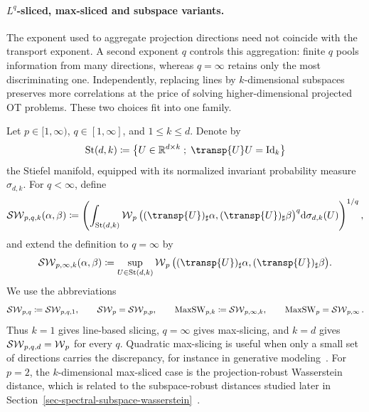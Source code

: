 \paragraph{$L^q$-sliced, max-sliced and subspace variants.}

The exponent used to aggregate projection directions need not coincide with the
transport exponent. A second exponent $q$ controls this aggregation: finite
$q$ pools information from many directions, whereas $q=\infty$ retains only
the most discriminating one. Independently, replacing lines by
$k$-dimensional subspaces preserves more correlations at the price of solving
higher-dimensional projected OT problems. These two choices fit into one
family.

\begin{defn}\label{def-sliced-variants}
	Let $p\in[1,\infty)$, $q\in[1,\infty]$, and $1\leq k\leq d$. Denote by
	\[
		\mathrm{St}(d,k)
		\eqdef
		\enscond{U\in\RR^{d\times k}}{\transp{U}U=\Id_k}
	\]
	the Stiefel manifold, equipped with its normalized invariant probability
	measure $\sigma_{d,k}$. For $q<\infty$, define
	\begin{equation}\label{eq-lq-subspace-sliced}
		\SW_{p,q,k}(\alpha,\beta)
		\eqdef
		\left(
			\int_{\mathrm{St}(d,k)}
			\Wass_p\big((\transp{U})_\sharp\alpha,
			              (\transp{U})_\sharp\beta\big)^q
			\d\sigma_{d,k}(U)
		\right)^{1/q},
	\end{equation}
	and extend the definition to $q=\infty$ by
	\[
		\SW_{p,\infty,k}(\alpha,\beta)
		\eqdef
		\sup_{U\in\mathrm{St}(d,k)}
		\Wass_p\big((\transp{U})_\sharp\alpha,
		              (\transp{U})_\sharp\beta\big).
	\]
	We use the abbreviations
	\[
		\operatorname{\mathcal{SW}}_{p,q}\coloneqq\operatorname{\mathcal{SW}}_{p,q,1},
		\qquad
		\operatorname{\mathcal{SW}}_p=\operatorname{\mathcal{SW}}_{p,p},
		\qquad
		\operatorname{MaxSW}_{p,k}\coloneqq\operatorname{\mathcal{SW}}_{p,\infty,k},
		\qquad
		\operatorname{MaxSW}_p=\operatorname{\mathcal{SW}}_{p,\infty}.
	\]
	Thus $k=1$ gives line-based slicing, $q=\infty$ gives max-slicing,
	and $k=d$ gives $\operatorname{\mathcal{SW}}_{p,q,d}=\operatorname{\mathcal{W}}_p$ for every $q$. Quadratic max-slicing is useful
	when only a small set of directions carries the discrepancy, for instance in
	generative modeling~\cite{deshpande2019maxsliced}. For $p=2$, the $k$-dimensional
	max-sliced case is the projection-robust Wasserstein distance, which is related to the
	subspace-robust distances studied later in
	Section~\ref{sec-spectral-subspace-wasserstein}~\cite{paty2019subspace}.
\end{defn}


